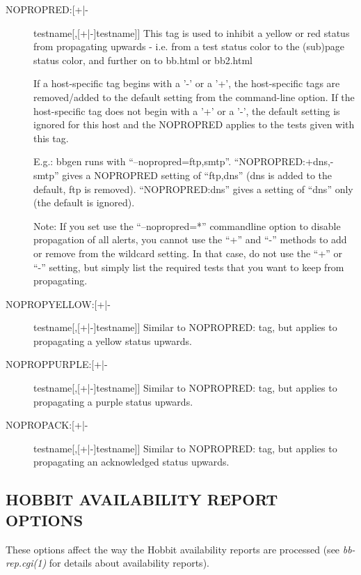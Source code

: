  \begin{description}
\item[NOPROPRED:[+|-]testname[,[+|-]testname]] This tag is used to
  inhibit a yellow or red status from propagating upwards - i.e. from
  a test status color to the (sub)page status color, and further on to
  bb.html or bb2.html 


  If a host-specific tag begins with a '-' or a '+', the host-specific
  tags are removed/added to the default setting from the command-line
  option. If the host-specific tag does not begin with a '+' or a '-',
  the default setting is ignored for this host and the NOPROPRED
  applies to the tests given with this tag. 



  E.g.: bbgen runs with
  ``--nopropred=ftp,smtp''. ``NOPROPRED:+dns,-smtp'' gives a NOPROPRED
  setting of ``ftp,dns'' (dns is added to the default, ftp is
  removed). ``NOPROPRED:dns'' gives a setting of ``dns'' only (the
  default is ignored). 



  Note: If you set use the ``--nopropred=*'' commandline option to
  disable propagation of all alerts, you cannot use the ``+'' and
  ``-'' methods to add or remove from the wildcard setting. In that
  case, do not use the ``+'' or ``-'' setting, but simply list the
  required tests that you want to keep from propagating. 



 

\item[NOPROPYELLOW:[+|-]testname[,[+|-]testname]] Similar to
  NOPROPRED: tag, but applies to propagating a yellow status upwards. 


 

\item[NOPROPPURPLE:[+|-]testname[,[+|-]testname]] Similar to
  NOPROPRED: tag, but applies to propagating a purple status upwards. 


 

\item[NOPROPACK:[+|-]testname[,[+|-]testname]] Similar to NOPROPRED:
  tag, but applies to propagating an acknowledged status upwards. 


 


 


\end{description}

\subsection{HOBBIT AVAILABILITY REPORT OPTIONS}
 These options affect the way the Hobbit availability reports are processed (see \emph{bb-rep.cgi(1)}
 for details about availability reports). 

